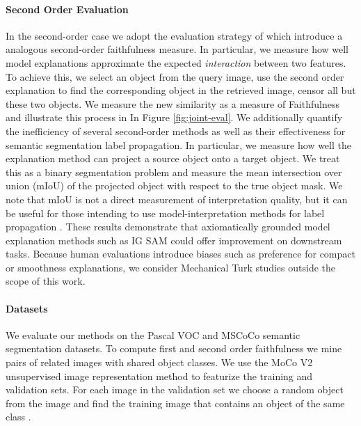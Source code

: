 \documentclass{article} %
\begin{document}
\paragraph{Second Order Evaluation} In the second-order case we adopt the evaluation strategy of \cite{integrated-hessians} which introduce a analogous second-order faithfulness measure. In particular, we measure how well model explanations approximate the expected \textit{interaction} between two features. To achieve this, we select an object from the query image, use the second order explanation to find the corresponding object in the retrieved image, censor all but these two objects. We measure the new similarity as a measure of Faithfulness and illustrate this process in In Figure \ref{fig:joint-eval}.  We additionally quantify the inefficiency of several second-order methods as well as their effectiveness for semantic segmentation label propagation. In particular, we measure how well the explanation method can project a source object onto a target object. We treat this as a binary segmentation problem and measure the mean intersection over union (mIoU) of the projected object with respect to the true object mask. We note that mIoU is not a direct measurement of interpretation quality, but it can be useful for those intending to use model-interpretation methods for label propagation \citep{ahn2019weakly,wang2020self}. These results demonstrate that axiomatically grounded model explanation methods such as IG SAM could offer improvement on downstream tasks. Because human evaluations introduce biases such as preference for compact or smoothness explanations, we consider Mechanical Turk \citep{paolacci2010running} studies outside the scope of this work. 
\vspace{-0.15in}
\paragraph{Datasets} We evaluate our methods on the Pascal VOC \citep{Everingham10} and MSCoCo \cite{cocostuff} semantic segmentation datasets. To compute first and second order faithfulness we mine pairs of related images with shared object classes. We use the MoCo V2 \citep{mocov2} unsupervised image representation method to featurize the training and validation sets. For each image in the validation set we choose a random object from the image and find the training image that contains an object of the same class \citep{hamilton2020conditional}.
\vspace{-0.15in}
\end{document}
